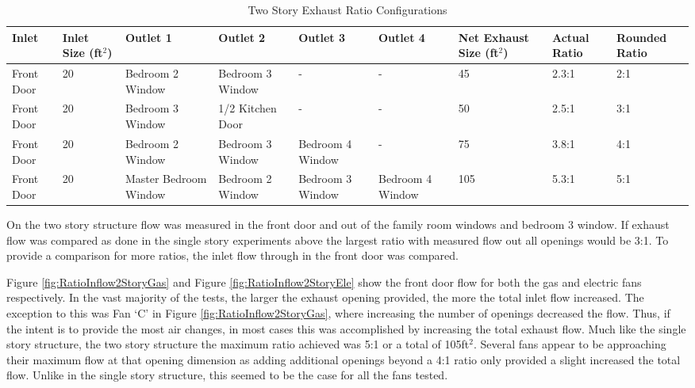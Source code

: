 \documentclass{article}
\begin{document}
\begin{table}[H]
	\centering
	\caption {Two Story Exhaust Ratio Configurations}
	\begin{tabular}{|C{.45in}|C{.6in}|C{.7in}|C{.7in}|C{.7in}|C{.7in}|C{.6in}|C{.45in}|C{.5in}|}
		\hline
		Inlet & Inlet Size (ft$^2$) & Outlet 1 & Outlet 2 & Outlet 3 & Outlet 4 & Net Exhaust Size (ft$^2$) & Actual Ratio & Rounded Ratio \\ \hline \hline
		Front Door & 20 & Bedroom 2 Window & Bedroom 3 Window & - & - & 45 & 2.3:1 & 2:1 \\ \hline
		Front Door & 20 & Bedroom 3 Window & 1/2 Kitchen Door & - & - & 50 & 2.5:1 & 3:1 \\ \hline
		Front Door & 20 & Bedroom 2 Window & Bedroom 3 Window & Bedroom 4 Window & - & 75 & 3.8:1 & 4:1 \\ \hline
		Front Door & 20 & Master Bedroom Window & Bedroom 2 Window & Bedroom 3 Window & Bedroom 4 Window & 105 & 5.3:1 & 5:1 \\ \hline
	\end{tabular}
	\label{table:RatioExhaustComp_2Story}
\end{table}

On the two story structure flow was measured in the front door and out of the family room windows and bedroom 3 window. If exhaust flow was compared as done in the single story experiments above the largest ratio with measured flow out all openings would be 3:1. To provide a comparison for more ratios, the inlet flow through in the front door was compared. 

Figure \ref{fig:RatioInflow2StoryGas} and Figure \ref{fig:RatioInflow2StoryEle} show the front door flow for both the gas and electric fans respectively. In the vast majority of the tests, the larger the exhaust opening provided, the more the total inlet flow increased. The exception to this was Fan `C' in Figure \ref{fig:RatioInflow2StoryGas}, where increasing the number of openings decreased the flow. Thus, if the intent is to provide the most air changes, in most cases this was accomplished by increasing the total exhaust flow. Much like the single story structure, the two story structure the maximum ratio achieved was 5:1 or a total of 105ft$^2$. Several fans appear to be approaching their maximum flow at that opening dimension as adding additional openings beyond a 4:1 ratio only provided a slight increased the total flow. Unlike in the single story structure, this seemed to be the case for all the fans tested. 
\end{document}
